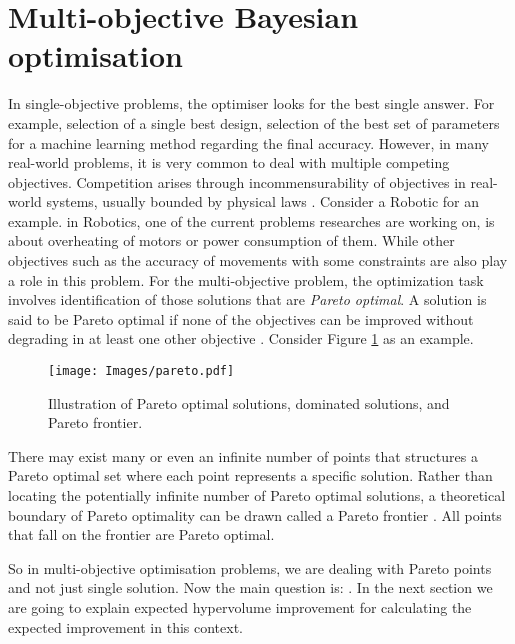 \section{Multi-objective Bayesian optimisation}
In single-objective problems, the optimiser looks for the best single answer. For example, selection of a single best design, selection of the best set of parameters for a machine learning method regarding the final accuracy. However, in many real-world problems, it is very common to deal with multiple competing objectives. Competition arises through incommensurability of objectives in real-world systems, usually bounded by physical laws \cite{rousis2011pareto}. Consider a Robotic for an example. in Robotics, one of the current problems researches are working on, is about overheating of motors or power consumption of them. While other objectives such as the accuracy of movements with some constraints are also play a role in this problem.
For the multi-objective problem, the optimization task involves identification of those solutions that are \textit{Pareto optimal}. A solution is said to be Pareto optimal if none of the objectives can be improved without degrading in at least one other objective \cite{rousis2011pareto}. Consider Figure \ref{fig:par} as an example.
\begin{figure}[h]
\centering
\texttt{[image: Images/pareto.pdf]}
\caption{Illustration of Pareto optimal solutions, dominated solutions, and Pareto frontier.}
\label{fig:par}
\end{figure}
There may exist many or even an infinite number of points that structures a Pareto optimal set where each point represents a specific solution. Rather than locating the potentially infinite number of Pareto optimal solutions, a theoretical boundary of Pareto optimality can be drawn called a Pareto frontier \cite{rousis2011pareto}. All points that fall on the frontier are Pareto optimal. 
\par
So in multi-objective optimisation problems, we are dealing with Pareto points and not just single solution. Now the main question is: . In the next section we are going to explain expected hypervolume improvement for calculating the expected improvement in this context.

